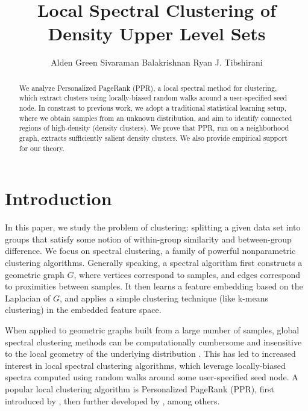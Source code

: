 \documentclass{article}
\title{Local Spectral Clustering of Density Upper Level Sets}
\author{
Alden Green \And
Sivaraman Balakrishnan \And
Ryan J. Tibshirani}
\newcommand{\1}{\mathbf{1}}
\theoremstyle{aldenthm}
\theoremstyle{aldenrmrk}
\begin{document}
\maketitle

\vspace{0.1in}
\begin{abstract}
We analyze Personalized PageRank (PPR), a local spectral method for clustering,
which extract clusters using locally-biased random walks around a user-specified
seed node.  In constrast to previous work, we adopt a traditional statistical
learning setup, where we obtain samples from an unknown distribution, and aim to
identify connected regions of high-density (density clusters).  We prove that
PPR, run on a neighborhood graph, extracts sufficiently salient density
clusters. We also provide empirical support for our theory.
\end{abstract}

\section{Introduction}
\label{sec: introduction}

In this paper, we study the problem of clustering: splitting a given data set
into groups that satisfy some notion of within-group similarity and
between-group difference.  We focus on spectral clustering, a family of powerful
nonparametric clustering algorithms.  Generally speaking, a spectral algorithm
first constructs a geometric graph $G$, where vertices correspond to samples,
and edges correspond to proximities between samples. It then learns a feature
embedding based on the Laplacian of $G$, and applies a simple clustering
technique (like k-means clustering) in the embedded feature space.

When applied to geometric graphs built from a large number of samples,
global spectral clustering methods can be computationally cumbersome and   
insensitive to the local geometry of the underlying distribution
\citep{leskovec2010,mahoney2012}.  This has led to increased interest in
local spectral clustering algorithms, which leverage locally-biased spectra
computed using random walks around some user-specified seed node.  A popular 
local clustering algorithm is Personalized PageRank (PPR), first introduced by 
\citet{haveliwala2003}, then further developed by
\citep{spielman2011,spielman2014,andersen2006,mahoney2012,zhu2013},
among others.  
\end{document}
